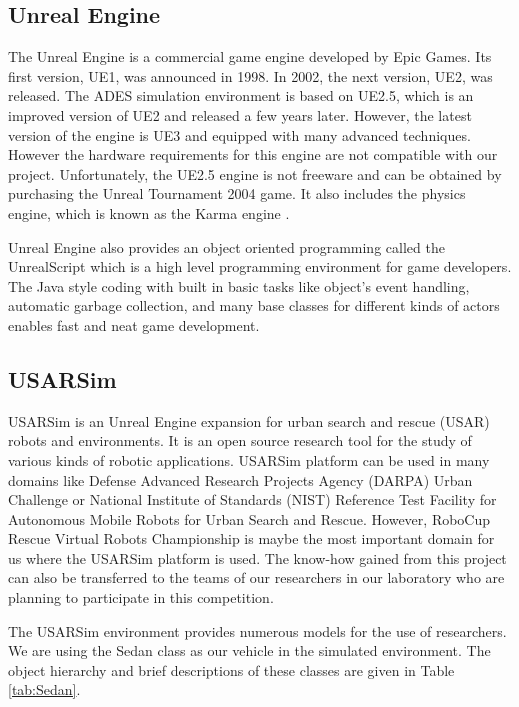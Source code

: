 \documentclass[a4paper,oneside,12pt]{report}
\begin{document}
\subsection{Unreal Engine}
The Unreal Engine is a commercial game engine developed by Epic Games. Its first version, UE1, was announced in 1998. In 2002, the next version, UE2, was released. The ADES simulation environment is based on UE2.5, which is an improved version of UE2 and released a few years later. However, the latest version of the engine is UE3 and equipped with many advanced techniques. However the hardware requirements for this engine are not compatible with our project. Unfortunately, the UE2.5 engine is not freeware and can be obtained by purchasing the Unreal Tournament 2004 game. It also includes the physics engine, which is known as the Karma engine \cite{epic_karma_2002}.

Unreal Engine also provides an object oriented programming called the UnrealScript which is a high level programming environment for game developers. The Java style coding with built in basic tasks like object's event handling, automatic garbage collection, and many base classes for different kinds of actors enables fast and neat game development.

\subsection{USARSim}

USARSim is an Unreal Engine expansion for urban search and rescue (USAR) robots and environments. It is an open source research tool for the study of various kinds of robotic applications. USARSim platform can be used in many domains like Defense Advanced Research Projects Agency (DARPA) Urban Challenge or National Institute of Standards (NIST) Reference Test Facility for Autonomous Mobile Robots for Urban Search and Rescue. However, RoboCup Rescue Virtual Robots Championship is maybe the most important domain for us where the USARSim platform is used. The know-how gained from this project can also be transferred to the teams of our researchers in our laboratory who are planning to participate in this competition.

The USARSim environment provides numerous models for the use of researchers. We are using the Sedan class as our vehicle in the simulated environment. The object hierarchy and brief descriptions of these classes are given in Table \ref{tab:Sedan}.
\end{document}
